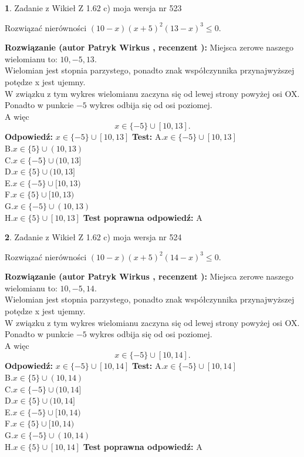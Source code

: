 \documentclass[12pt, a4paper]{article}
\theoremstyle{definition} %
\newtheorem{zad}{}
\newcommand{\zadStart}[1]{\begin{zad}#1\newline}
\newcommand{\zadStop}{\end{zad}}
\newcommand{\rozwStart}[2]{\noindent \textbf{Rozwiązanie (autor #1 , recenzent #2): }\newline}
\newcommand{\rozwStop}{\newline}
\newcommand{\odpStart}{\noindent \textbf{Odpowiedź:}\newline}
\newcommand{\odpStop}{\newline}
\newcommand{\testStart}{\noindent \textbf{Test:}\newline}
\newcommand{\testStop}{\newline}
\newcommand{\kluczStart}{\noindent \textbf{Test poprawna odpowiedź:}\newline}
\newcommand{\kluczStop}{\newline}
\begin{document}
\zadStart{Zadanie z Wikieł Z 1.62 c) moja wersja nr 523}

Rozwiązać nierówności $(10-x)(x+5)^{2}(13-x)^{3}\le0$.
\zadStop
\rozwStart{Patryk Wirkus}{}
Miejsca zerowe naszego wielomianu to: $10, -5, 13$.\\
Wielomian jest stopnia parzystego, ponadto znak współczynnika przy\linebreak najwyższej potędze x jest ujemny.\\ W związku z tym wykres wielomianu zaczyna się od lewej strony powyżej osi OX.\\
Ponadto w punkcie $-5$ wykres odbija się od osi poziomej.\\
A więc $$x \in \{-5\} \cup [10,13].$$
\rozwStop
\odpStart
$x \in \{-5\} \cup [10,13]$
\odpStop
\testStart
A.$x \in \{-5\} \cup [10,13]$\\
B.$x \in \{5\} \cup (10,13)$\\
C.$x \in \{-5\} \cup (10,13]$\\
D.$x \in \{5\} \cup (10,13]$\\
E.$x \in \{-5\} \cup [10,13)$\\
F.$x \in \{5\} \cup [10,13)$\\
G.$x \in \{-5\} \cup (10,13)$\\
H.$x \in \{5\} \cup [10,13]$
\testStop
\kluczStart
A
\kluczStop



\zadStart{Zadanie z Wikieł Z 1.62 c) moja wersja nr 524}

Rozwiązać nierówności $(10-x)(x+5)^{2}(14-x)^{3}\le0$.
\zadStop
\rozwStart{Patryk Wirkus}{}
Miejsca zerowe naszego wielomianu to: $10, -5, 14$.\\
Wielomian jest stopnia parzystego, ponadto znak współczynnika przy\linebreak najwyższej potędze x jest ujemny.\\ W związku z tym wykres wielomianu zaczyna się od lewej strony powyżej osi OX.\\
Ponadto w punkcie $-5$ wykres odbija się od osi poziomej.\\
A więc $$x \in \{-5\} \cup [10,14].$$
\rozwStop
\odpStart
$x \in \{-5\} \cup [10,14]$
\odpStop
\testStart
A.$x \in \{-5\} \cup [10,14]$\\
B.$x \in \{5\} \cup (10,14)$\\
C.$x \in \{-5\} \cup (10,14]$\\
D.$x \in \{5\} \cup (10,14]$\\
E.$x \in \{-5\} \cup [10,14)$\\
F.$x \in \{5\} \cup [10,14)$\\
G.$x \in \{-5\} \cup (10,14)$\\
H.$x \in \{5\} \cup [10,14]$
\testStop
\kluczStart
A
\kluczStop
\end{document}
